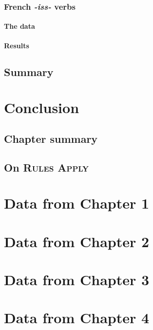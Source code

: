 \documentclass{upenndiss}
\begin{document}
\subsection{French \emph{-iss-} verbs}

\subsubsection{The data}

\subsubsection{Results}

\section{Summary}

\chapter{Conclusion}
\lipsum

\section{Chapter summary}

\section{On \textsc{Rules Apply}}

\appendix

\chapter{Data from Chapter 1}


\chapter{Data from Chapter 2}


\chapter{Data from Chapter 3}
\lipsum
%

\chapter{Data from Chapter 4}
\lipsum
%
\end{document}
